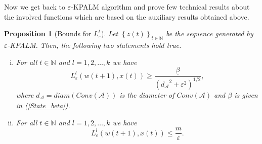 \documentclass[11pt]{article}
\numberwithin{equation}{section}
\newtheorem{proposition}{Proposition}[section]
\begin{document}

Now we get back to $\varepsilon$-KPALM algorithm and prove few technical results about the involved functions which are based on the auxiliary results obtained above.

\begin{proposition}[Bounds for $L^l_{\varepsilon}$] \label{State_L_bounds}
Let $\left\lbrace z(t) \right\rbrace_{t \in \mathbb{N}}$ be the sequence generated by $\varepsilon$-KPALM. Then, the following two statements hold true.
\begin{enumerate}[(i)]
	\item For all $t \in \mathbb{N}$ and $l=1,2, \ldots, k$ we have
	\begin{equation*}
		L^l_{\varepsilon}(w(t+1),x(t)) \geq \frac{\underline{\beta}}{\left( {d_{\mathcal{A}}}^2 + {\varepsilon}^2 \right)^{1/2}} ,
	\end{equation*}
	where $d_{\mathcal{A}} = diam(Conv(\mathcal{A}))$ is the diameter of $Conv(\mathcal{A})$ and $\underline{\beta}$ is given in (\ref{State_beta}). \label{State_L_bounds1}
	\item For all $t \in \mathbb{N}$ and $l=1,2, \ldots, k$ we have
	\begin{equation*}
		L^l_{\varepsilon}(w(t+1),x(t)) \leq \frac{m}{\varepsilon} .
	\end{equation*} \label{State_L_bounds2}
\end{enumerate}
\end{proposition}
\end{document}
